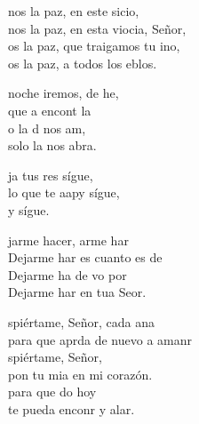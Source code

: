 \documentclass[12pt]{article}
\begin{document}
\begin{multicols*}{2}
\begin{cancion}%
	nos la paz, en este sicio,\\
	nos la paz, en esta viocia, Señor,\\
	os la paz, que traigamos tu ino,\\
	os la paz, a todos los eblos.\\
\end{cancion}%

\begin{cancion}%
	noche iremos, de he,\\
	que a encont la \\
	o la d nos am,\\
	solo la  nos abra.\\
\end{cancion}%

\begin{cancion}%
	ja tus res sígue,\\
	lo que te aapy sígue,\\
	y sígue.\\
\end{cancion}%

\begin{cancion}%
	jarme hacer, arme har  \\
	Dejarme har es cuanto es de  \\
	Dejarme ha de vo por \\
	Dejarme har en tua Seor.\\
\end{cancion}%

\begin{cancion}[Despiértame][Ixcís]%
	spiértame, Señor, cada ana \\
	para que aprda de nuevo a amanr\\
	spiértame, Señor,\\
	pon tu mia en mi corazón.\\
	para que do hoy \\
	te pueda enconr y alar.\\
\end{cancion}%


\end{multicols*}
\end{document}

